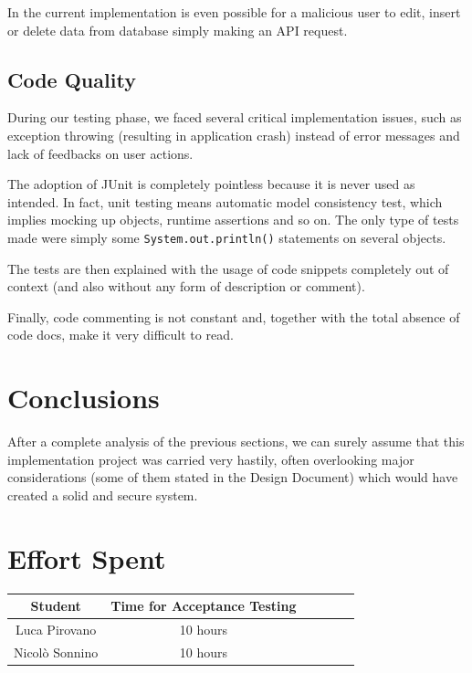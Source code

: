 \documentclass[table, 12pt]{article}
\begin{document}
In the current implementation is even possible for a malicious user to edit, insert or delete data from database simply making an API request.

\subsection{Code Quality}
During our testing phase, we faced several critical implementation issues, such as exception throwing (resulting in application crash) instead of error messages and lack of feedbacks on user actions.

The adoption of JUnit is completely pointless because it is never used as intended. In fact, unit testing means automatic model consistency test, which implies mocking up objects, runtime assertions and so on. The only type of tests made were simply some \texttt{System.out.println()} statements on several objects.

The tests are then explained with the usage of code snippets completely out of context (and also without any form of description or comment).

Finally, code commenting is not constant and, together with the total absence of code docs, make it very difficult to read.
\newpage
\section{Conclusions}
After a complete analysis of the previous sections, we can surely assume that this implementation project was carried very hastily, often overlooking major considerations (some of them stated in the Design Document) which would have created a solid and secure system.

\section{Effort Spent}
\begin{center}
    \begin{tabular}{ | c || c | c | c | c| c|}
        \hline
        Student        & Time for Acceptance Testing \\ \hline
        Luca Pirovano  & 10 hours                    \\ \hline
        Nicolò Sonnino & 10 hours                    \\
        \hline
    \end{tabular}
\end{center}
\end{document}
